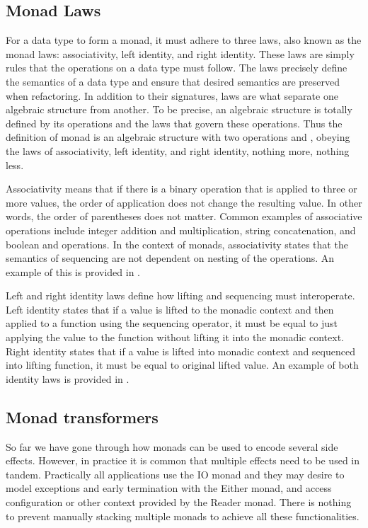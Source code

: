 \subsection{Monad Laws} \label{monads:laws}
For a data type to form a monad, it must adhere to three laws, also known as the monad laws: associativity, left identity, and right identity. These laws are simply rules that the operations on a data type must follow. The laws precisely define the semantics of a data type and ensure that desired semantics are preserved when refactoring. In addition to their signatures, laws are what separate one algebraic structure from another.
To be precise, an algebraic structure is totally defined by its operations and the laws that govern these operations. Thus the definition of monad is an algebraic structure with two operations
 and , obeying the laws of associativity, left identity, and right identity, nothing more, nothing less.~\cite{fp-in-scala}



Associativity means that if there is a binary operation that is applied to three or more values, the order of application does not change the resulting value. In other words, the order of parentheses does not matter. Common examples of associative operations include integer addition and multiplication, string concatenation, and boolean \inlinecode{&&} and \inlinecode{||} operations. In the context of monads, associativity states that the semantics of sequencing are not dependent on nesting of the  operations. An example of this is provided in .



Left and right identity laws define how lifting and sequencing must interoperate. Left identity states that if a value is lifted to the monadic context and then applied to a function using the sequencing operator, it must be equal to just applying the value to the function without lifting it into the monadic context. Right identity states that if a value is lifted into monadic context and sequenced into lifting function, it must be equal to original lifted value. An example of both identity laws is provided in .


\subsection{Monad transformers}\label{monads:monad-transformers}
So far we have gone through how monads can be used to encode several side effects. However, in practice it is common that multiple effects need to be used in tandem. Practically all applications use the IO monad and they may desire to model exceptions and early termination with the Either monad, and access configuration or other context provided by the Reader monad. There is nothing to prevent manually stacking multiple monads to achieve all these functionalities.

